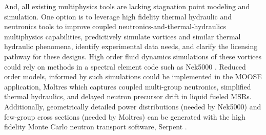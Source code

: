 And, all existing multiphysics tools are lacking stagnation point modeling and 
simulation. One option is to 
leverage high fidelity thermal hydraulic and
neutronics tools to improve coupled neutronics-and-thermal-hydraulics
multiphysics capabilities, predictively simulate vortices and similar thermal
hydraulic phenomena, identify experimental data needs, and clarify the
licensing pathway for these designs.
High order fluid dynamics simulations of these vortices could rely on methods 
in a spectral element code such as Nek5000 \cite{fischer_petascale_2008}. 
Reduced order models, informed by such simulations could be implemented in the 
\gls{MOOSE} \cite{gaston_parallel_2009} application, Moltres 
\cite{lindsay_introduction_2018} which captures coupled multi-group neutronics, 
simplified thermal hydraulics, and delayed neutron precursor drift in liquid 
fueled \glspl{MSR}.  Additionally, geometrically detailed power distributions 
(needed by Nek5000) and few-group cross sections (needed by Moltres) can be 
generated with the high fidelity Monte Carlo neutron transport software, 
Serpent \cite{leppanen_serpent_2015}.

